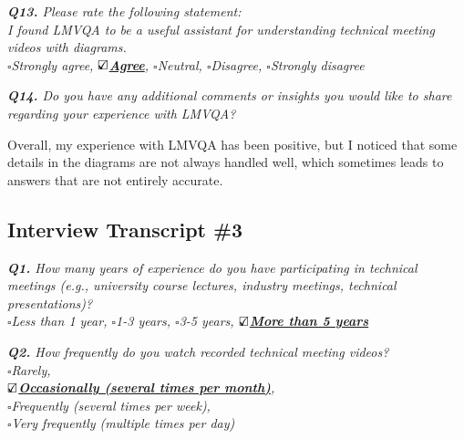 \vspace*{1em}\noindent\textit{\textbf{Q13.} Please rate the following statement:
\\[.5em]
\textit{I found LMVQA to be a useful assistant for understanding technical meeting videos with diagrams.}
\\[.5em]
\indent $\square$Strongly agree,
\underline{\bfseries$\text{\rlap{$\checkmark$}}\square$Agree},
$\square$Neutral,
$\square$Disagree,
$\square$Strongly disagree
}

\vspace*{1em}

\noindent\textit{\textbf{Q14.} Do you have any additional comments or insights you would like to share regarding your experience with LMVQA?
}

\begin{samepage}
\begin{mdframed}[style=MyFrame]
Overall, my experience with LMVQA has been positive, but I noticed that some details in the diagrams are not always handled well, which sometimes leads to answers that are not entirely accurate.
\end{mdframed}
\end{samepage}



\noindent\hrulefill 

\subsection{Interview Transcript \#3}
\label{appendix:transcript3}


\vspace*{.6cm}

\vspace*{1em}\noindent\textit{\textbf{Q1.} How many years of experience do you have participating in technical meetings (e.g., university course lectures, industry meetings, technical presentations)?
\\[.5em]
        \indent $\square$Less than 1 year,
        $\square$1-3 years,
        $\square$3-5 years,
       \underline{\bfseries$\text{\rlap{$\checkmark$}}\square$More than 5 years}
}


\vspace*{1em}\noindent\textit{\textbf{Q2.} How frequently do you watch recorded technical meeting videos?
\\[.5em]
        \indent $\square$Rarely,\\
        \indent\underline{\bfseries$\text{\rlap{$\checkmark$}}\square$Occasionally (several times per month)},\\
        \indent$\square$Frequently (several times per week),\\
        \indent$\square$Very frequently (multiple times per day)
}

